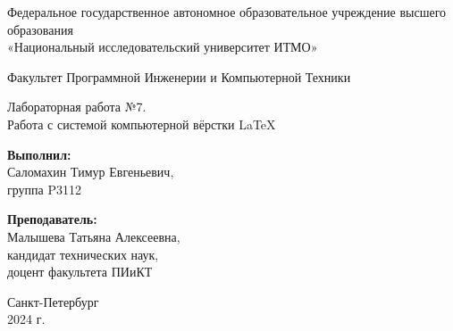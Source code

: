 


\newcommand{\GQ}[1]{\guillemotleft{}#1\guillemotright{}}

% 

\begin{center}
    Федеральное государственное автономное образовательное учреждение высшего образования\\
    «Национальный исследовательский университет ИТМО»
    \vspace{1em}

    Факультет Программной Инженерии и Компьютерной Техники

    \vfill

    Лабораторная работа №7.\\
    \GQ{Работа с системой компьютерной вёрстки \LaTeX}
\end{center}

\vfill

\begin{flushright}
    \textbf{Выполнил:}\\
    Саломахин Тимур Евгеньевич,\\ группа P3112

    \vspace{1em}

    \textbf{Преподаватель:}\\
    Малышева Татьяна Алексеевна,\\
    кандидат технических наук,\\
    доцент факультета ПИиКТ
\end{flushright}

\vfill

\begin{center}
    Санкт-Петербург \\ 2024 г.
\end{center}

% 